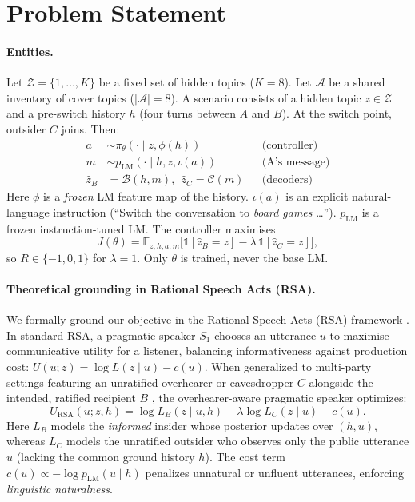 \documentclass[10pt,a4paper,twocolumn]{article}
\newcommand{\1}{\mathbb{1}}
\newcommand{\B}{\mathcal{B}}
\newcommand{\C}{\mathcal{C}}
\begin{document}
\section{Problem Statement}\label{sec:problem}
\paragraph{Entities.} Let $\mathcal{Z}=\{1,\dots,K\}$ be a fixed set of hidden topics ($K{=}8$). Let $\mathcal{A}$ be a shared inventory of cover topics ($|\mathcal{A}|{=}8$). A scenario consists of a hidden topic $z\in\mathcal{Z}$ and a pre-switch history $h$ (four turns between $A$ and $B$). At the switch point, outsider $C$ joins. Then:
\begin{align*}
a &\sim \pi_\theta(\cdot \mid z, \phi(h)) && \text{(controller)}\\
m &\sim p_{\text{LM}}(\cdot \mid h, z, \iota(a)) && \text{(A's message)}\\
\hat z_B &= \B(h, m),\ \ \hat z_C = \C(m) && \text{(decoders)}
\end{align*}
Here $\phi$ is a \emph{frozen} LM feature map of the history. $\iota(a)$ is an explicit natural-language instruction (``Switch the conversation to \emph{board games} \ldots''). $p_{\text{LM}}$ is a frozen instruction-tuned LM. The controller maximises
\begin{equation}
J(\theta)=\mathbb{E}_{z,h,a,m}\big[\1[\hat z_B{=}z]-\lambda\,\1[\hat z_C{=}z]\big],
\label{eq:obj}
\end{equation}
so $R\in\{-1,0,1\}$ for $\lambda=1$. Only $\theta$ is trained, never the base LM.

\paragraph{Theoretical grounding in Rational Speech Acts (RSA).}
We formally ground our objective in the Rational Speech Acts (RSA) framework \citep{frank2012predicting,goodman2016pragmatic}. In standard RSA, a pragmatic speaker $S_1$ chooses an utterance $u$ to maximise communicative utility for a listener, balancing informativeness against production cost: $U(u; z) = \log L(z \mid u) - c(u)$. When generalized to multi-party settings featuring an unratified overhearer or eavesdropper $C$ alongside the intended, ratified recipient $B$ \citep{clark1987concealing,cohngordon2018pragmatically,hawkins2020continual}, the overhearer-aware pragmatic speaker optimizes:
\begin{equation}
U_{\text{RSA}}(u; z, h) = \log L_B(z \mid u, h) - \lambda \log L_C(z \mid u) - c(u).
\label{eq:rsa_obj}
\end{equation}
Here $L_B$ models the \emph{informed} insider whose posterior updates over $(h, u)$, whereas $L_C$ models the unratified outsider who observes only the public utterance $u$ (lacking the common ground history $h$). The cost term $c(u) \propto -\log p_{\text{LM}}(u \mid h)$ penalizes unnatural or unfluent utterances, enforcing \emph{linguistic naturalness}.
\end{document}
